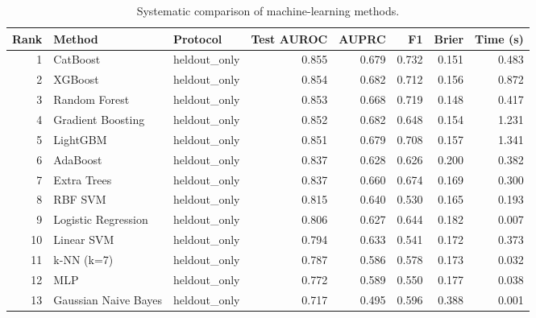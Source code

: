 \begin{table}[htbp]
\centering
\caption{Systematic comparison of machine-learning methods.}
\label{tab:method_comparison_recomputed}
\begin{tabular}{rllrrrrr}
\toprule
Rank & Method & Protocol & Test AUROC & AUPRC & F1 & Brier & Time (s) \\
\midrule
1 & CatBoost & heldout\_only & 0.855 & 0.679 & 0.732 & 0.151 & 0.483 \\
2 & XGBoost & heldout\_only & 0.854 & 0.682 & 0.712 & 0.156 & 0.872 \\
3 & Random Forest & heldout\_only & 0.853 & 0.668 & 0.719 & 0.148 & 0.417 \\
4 & Gradient Boosting & heldout\_only & 0.852 & 0.682 & 0.648 & 0.154 & 1.231 \\
5 & LightGBM & heldout\_only & 0.851 & 0.679 & 0.708 & 0.157 & 1.341 \\
6 & AdaBoost & heldout\_only & 0.837 & 0.628 & 0.626 & 0.200 & 0.382 \\
7 & Extra Trees & heldout\_only & 0.837 & 0.660 & 0.674 & 0.169 & 0.300 \\
8 & RBF SVM & heldout\_only & 0.815 & 0.640 & 0.530 & 0.165 & 0.193 \\
9 & Logistic Regression & heldout\_only & 0.806 & 0.627 & 0.644 & 0.182 & 0.007 \\
10 & Linear SVM & heldout\_only & 0.794 & 0.633 & 0.541 & 0.172 & 0.373 \\
11 & k-NN (k=7) & heldout\_only & 0.787 & 0.586 & 0.578 & 0.173 & 0.032 \\
12 & MLP & heldout\_only & 0.772 & 0.589 & 0.550 & 0.177 & 0.038 \\
13 & Gaussian Naive Bayes & heldout\_only & 0.717 & 0.495 & 0.596 & 0.388 & 0.001 \\
\bottomrule
\end{tabular}

\end{table}
